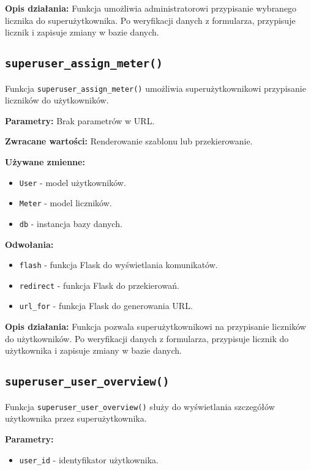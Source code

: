 \documentclass[12pt,a4paper]{report}
\begin{document}
\textbf{Opis działania:}
Funkcja umożliwia administratorowi przypisanie wybranego licznika do superużytkownika. Po weryfikacji danych z formularza, przypisuje licznik i zapisuje zmiany w bazie danych.

\subsection{\texttt{superuser\_assign\_meter()}}
\label{sec:superuser_assign_meter}
Funkcja \texttt{superuser\_assign\_meter()} umożliwia superużytkownikowi przypisanie liczników do użytkowników.

\textbf{Parametry:} Brak parametrów w URL.

\textbf{Zwracane wartości:} Renderowanie szablonu lub przekierowanie.

\textbf{Używane zmienne:}
\begin{itemize}
    \item \texttt{User} - model użytkowników.
    \item \texttt{Meter} - model liczników.
    \item \texttt{db} - instancja bazy danych.
\end{itemize}

\textbf{Odwołania:}
\begin{itemize}
    \item \texttt{flash} - funkcja Flask do wyświetlania komunikatów.
    \item \texttt{redirect} - funkcja Flask do przekierowań.
    \item \texttt{url\_for} - funkcja Flask do generowania URL.
\end{itemize}

\textbf{Opis działania:}
Funkcja pozwala superużytkownikowi na przypisanie liczników do użytkowników. Po weryfikacji danych z formularza, przypisuje licznik do użytkownika i zapisuje zmiany w bazie danych.

\subsection{\texttt{superuser\_user\_overview()}}
\label{sec:superuser_user_overview}
Funkcja \texttt{superuser\_user\_overview()} służy do wyświetlania szczegółów użytkownika przez superużytkownika.

\textbf{Parametry:}
\begin{itemize}
    \item \texttt{user\_id} - identyfikator użytkownika.
\end{itemize}
\end{document}
